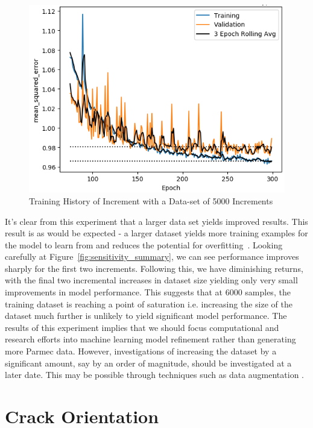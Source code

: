 \begin{figure}[b]
	\centering
	\includegraphics[scale=0.75]{Figures/TrainHistory_dataset_cases5000_C0_321_L0_13_0_321_0_13_48_1_allI0.png}
	\caption{Training History of Increment with a Data-set of 5000 Increments}
	\label{fig:history_5000}
\end{figure}

\noindent
It's clear from this experiment that a larger data set yields improved results. This result is as would be expected - a larger dataset yields more training examples for the model to learn from and reduces the potential for overfitting~\cite{hawkins2004problem}.  Looking carefully at Figure~\ref{fig:sensitivity_summary}, we can see performance improves sharply for the first two increments. Following this, we have diminishing returns, with the final two incremental increases in dataset size yielding only very small improvements in model performance.  This suggests that at 6000 samples,  the training dataset is reaching a point of saturation i.e. increasing the size of the dataset much further is unlikely to yield significant model performance. The results of this experiment implies that we should focus computational and research efforts into machine learning model refinement rather than generating more Parmec data. However, investigations of increasing the dataset by a significant amount, say by an order of magnitude, should be investigated at a later date. This may be possible through techniques such as data augmentation \cite{shorten2019survey}.


\section{Crack Orientation}

